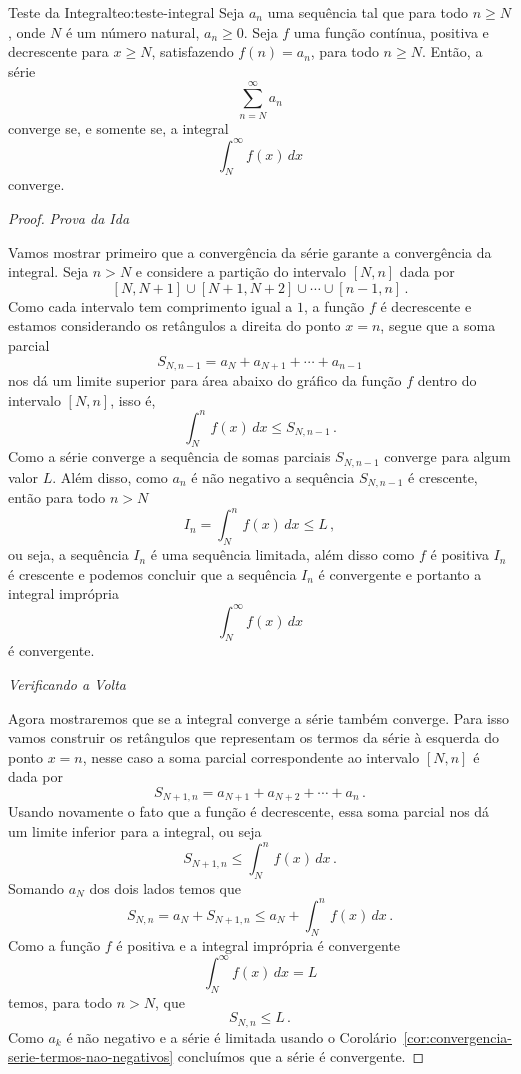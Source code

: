 \begin{teorema}{Teste da Integral}{teo:teste-integral}
  Seja
  $a_n$ uma sequência tal que para todo $n\geq N$, onde $N$ é um número natural,
  $a_n\geq 0$. Seja $f$ uma função contínua, positiva e decrescente para $x\geq N$,
  satisfazendo $f(n)=a_n$, para todo $n\geq N$. Então, a série
  \[
    \sum_{n=N}^\infty a_n
  \]
  converge se, e somente se, a integral
  \[
    \int_N^\infty f(x)\,dx
  \]
  converge.
\end{teorema}
\begin{proof}
\emph{Prova da Ida}

  Vamos mostrar primeiro que a convergência da série garante a convergência
  da integral.
  Seja $n>N$ e considere a partição do intervalo $[N, n]$ dada por
  \[
    [N, N+1] \cup [N+1, N+2]
             \cup \cdots
             \cup [n-1, n]    \,.
  \]
  Como cada intervalo tem comprimento igual a $1$,
  a função $f$ é decrescente e estamos considerando os retângulos a direita do
  ponto $x=n$, segue que a soma parcial
  \[
    S_{N,n-1} = a_N + a_{N+1} + \cdots + a_{n-1}
  \]
  nos dá um limite superior para área abaixo do gráfico da função $f$
  dentro do intervalo $[N, n]$, isso é,
  \[
    \int_N^n f(x)\,dx \leq S_{N,n-1}  \,.
  \]
  Como a série converge a sequência de somas parciais $S_{N,n-1}$
  converge para algum valor $L$.
  Além disso, como $a_n$ é não negativo a sequência $S_{N,n-1}$ é crescente,
  então para todo $n > N$
  \[
    I_n = \int_N^n f(x)\,dx \leq  L   \,,
  \]
  ou seja, a sequência $I_n$ é uma sequência limitada,
  além disso como $f$ é positiva $I_n$ é crescente e podemos
  concluir que a sequência $I_n$ é convergente e portanto
  a integral imprópria
  \[
    \int_N^\infty f(x)\,dx
  \]
  é convergente.

\emph{Verificando a Volta}

  Agora mostraremos que se a integral converge a série também converge.
  Para isso vamos construir os retângulos que representam os termos da
  série à esquerda do ponto $x=n$, nesse caso a soma parcial correspondente
  ao intervalo $[N, n]$ é dada por
  \[
    S_{N+1,n} = a_{N+1} + a_{N+2} + \cdots + a_{n}      \,.
  \]
  Usando novamente o fato que a função é decrescente,
  essa soma parcial nos dá um limite inferior para a integral, ou seja
  \[
    S_{N+1,n} \leq \int_N^n f(x)\,dx           \,.
  \]
  Somando $a_N$ dos dois lados temos que
  \[
    S_{N,n} = a_N + S_{N+1,n} \leq a_N + \int_N^n f(x)\, dx       \,.
  \]
  Como a função $f$ é positiva e a integral imprópria é convergente
  \[
    \int_N^\infty f(x)\,dx = L
  \]
  temos, para todo $n>N$,  que
  \[
    S_{N,n} \leq L     \,.
  \]
  Como $a_k$ é não negativo e a série é limitada
  usando o Corolário~\ref{cor:convergencia-serie-termos-nao-negativos}
  concluímos que a série é convergente.
\end{proof}

